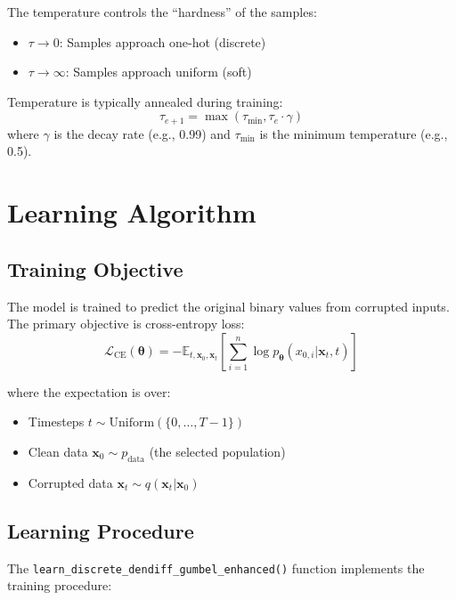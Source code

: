 \documentclass[11pt,a4paper]{article}
\newcommand{\E}{\mathbb{E}}
\newcommand{\vx}{\mathbf{x}}
\newcommand{\vtheta}{\boldsymbol{\theta}}
\begin{document}
The temperature controls the ``hardness'' of the samples:
\begin{itemize}
    \item $\tau \rightarrow 0$: Samples approach one-hot (discrete)
    \item $\tau \rightarrow \infty$: Samples approach uniform (soft)
\end{itemize}

Temperature is typically annealed during training:
\begin{equation}
    \tau_{e+1} = \max(\tau_{\min}, \tau_e \cdot \gamma)
\end{equation}
where $\gamma$ is the decay rate (e.g., 0.99) and $\tau_{\min}$ is the minimum temperature (e.g., 0.5).

\section{Learning Algorithm}

\subsection{Training Objective}

The model is trained to predict the original binary values from corrupted inputs. The primary objective is cross-entropy loss:
\begin{equation}
    \mathcal{L}_{\text{CE}}(\vtheta) = -\E_{t, \vx_0, \vx_t}\left[\sum_{i=1}^{n} \log p_\vtheta(x_{0,i} | \vx_t, t)\right]
\end{equation}

where the expectation is over:
\begin{itemize}
    \item Timesteps $t \sim \text{Uniform}(\{0, \ldots, T-1\})$
    \item Clean data $\vx_0 \sim p_{\text{data}}$ (the selected population)
    \item Corrupted data $\vx_t \sim q(\vx_t | \vx_0)$
\end{itemize}

\subsection{Learning Procedure}

The \texttt{learn\_discrete\_dendiff\_gumbel\_enhanced()} function implements the training procedure:
\end{document}
